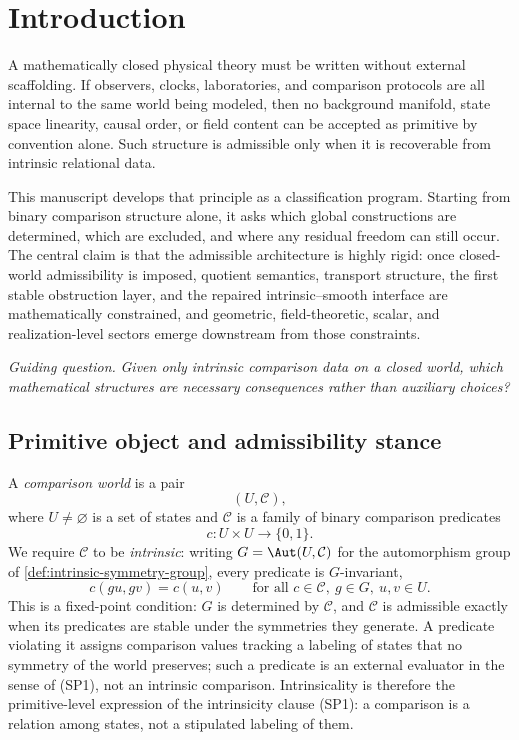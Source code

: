 \chapter*{Introduction}
\label{ch:introduction}
A mathematically closed physical theory must be written without
external scaffolding.
If observers, clocks, laboratories, and comparison protocols are all
internal to the same world being modeled, then no background manifold,
state space linearity, causal order, or field content can be accepted as
primitive by convention alone.
Such structure is admissible only when it is recoverable from
intrinsic relational data.

This manuscript develops that principle as a classification program.
Starting from binary comparison structure alone, it asks which global
constructions are determined, which are excluded, and where any residual
freedom can still occur.
The central claim is that the admissible architecture is highly rigid:
once closed-world admissibility is imposed, quotient semantics,
transport structure, the first stable obstruction layer, and the
repaired intrinsic--smooth interface are mathematically constrained,
and geometric, field-theoretic, scalar, and realization-level
sectors emerge downstream from those constraints.

\medskip
\noindent
\emph{Guiding question.}
\emph{Given only intrinsic comparison data on a closed world, which
mathematical structures are necessary consequences rather than
auxiliary choices?}
\medskip

\section{Primitive object and admissibility stance}
\begin{definition}
	\label{def:intro-comparison-world}
	A \emph{comparison world} is a pair
	\[
		(U,\mathcal C),
	\]
	where \(U\neq\varnothing\) is a set of states and
	\(\mathcal C\) is a family of binary comparison predicates
	\[
		c:U\times U\to\{0,1\}.
	\]
	We require \(\mathcal C\) to be \emph{intrinsic}: writing
	\(G=\Aut(U,\mathcal C)\) for the automorphism group of
	\cref{def:intrinsic-symmetry-group}, every predicate is
	\(G\)-invariant,
	\[
		c(gu,gv)=c(u,v)
		\qquad
		\text{for all }c\in\mathcal C,\ g\in G,\ u,v\in U.
	\]
	This is a fixed-point condition: \(G\) is determined by \(\mathcal C\),
	and \(\mathcal C\) is admissible exactly when its predicates are stable
	under the symmetries they generate. A predicate violating it assigns
	comparison values tracking a labeling of states that no symmetry of the
	world preserves; such a predicate is an external evaluator in the sense
	of \textup{(SP1)}, not an intrinsic comparison. Intrinsicality is
	therefore the primitive-level expression of the intrinsicity clause
	\textup{(SP1)}: a comparison is a relation among states, not a
	stipulated labeling of them.
\end{definition}

